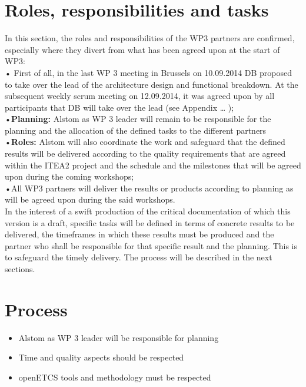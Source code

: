 \documentclass{template/openetcs_report}
\begin{document}
\section{Roles, responsibilities and tasks}
In this section, the roles and responsibilities of the WP3 partners are confirmed, especially where they divert from what has been agreed upon at the start of WP3:\\
•	First of all, in the last WP 3 meeting in Brussels on  10.09.2014 DB proposed to take over the lead of the architecture design and functional breakdown. At the subsequent weekly scrum meeting on 12.09.2014,  it was agreed upon by all participants that DB will take over the lead (see Appendix … );\\
•\textbf{Planning:} Alstom as WP 3 leader will remain to be responsible for the planning and the allocation of the defined tasks to the different partners\\
•\textbf{Roles:} Alstom will also coordinate the work and safeguard that the defined results will be delivered according to the quality requirements that are agreed within the ITEA2 project and the schedule and the milestones that will be agreed upon during the coming workshops;\\
•All WP3 partners will deliver the results or products according to planning as will be agreed upon during the said workshops. \\

In the interest of a swift production of the critical documentation of which this version is a draft, specific tasks will be defined in terms of concrete results to be delivered, the timeframes in which these results must be produced and the partner who shall be responsible for that specific result and the planning. This is to safeguard the timely delivery. The process will be described in the next sections.\\

\section{Process}
\begin{itemize}
\item Alstom as WP 3 leader will be responsible for planning
\item Time and quality aspects should be respected
\item openETCS tools and methodology must be respected
\end{itemize}
\end{document}
